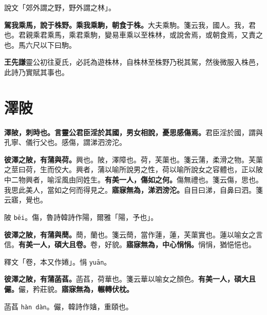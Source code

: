 \begin{quoting}說文「郊外謂之野，野外謂之林」。\end{quoting}

\textbf{駕我乘馬，說于株野。乘我乘駒，朝食于株。}{\footnotesize 大夫乘駒。箋云我，國人。我，君也。君親乘君乘馬，乘君乘駒，變易車乘以至株林，或說舍焉，或朝食焉，又責之也。馬六尺以下曰駒。}

\begin{quoting}\textbf{王先謙}靈公初往夏氏，必託為遊株林，自株林至株野乃税其駕，然後微服入株邑，此詩乃實賦其事也。\end{quoting}

\section{澤陂}


\textbf{澤陂，刺時也。言靈公君臣淫於其國，男女相說，憂思感傷焉。}{\footnotesize 君臣淫於國，謂與孔寧、儀行父也。感傷，謂涕泗滂沱。}

\textbf{彼澤之陂，有蒲與荷。}{\footnotesize 興也。陂，澤障也。荷，芙蕖也。箋云蒲，柔滑之物。芙蕖之莖曰荷，生而佼大。興者，蒲以喻所說男之性，荷以喻所說女之容體也，正以陂中二物興者，喻淫風由同姓生。}\textbf{有美一人，傷如之何。}{\footnotesize 傷無禮也。箋云傷，思也。我思此美人，當如之何而得見之。}\textbf{寤寐無為，涕泗滂沱。}{\footnotesize 自目曰涕，自鼻曰泗。箋云寤，覺也。}

\begin{quoting}陂 \texttt{bēi}。傷，魯詩韓詩作陽，爾雅「陽，予也」。\end{quoting}

\textbf{彼澤之陂，有蒲與蕳。}{\footnotesize 蕳，蘭也。箋云蕳，當作蓮，蓮，芙蕖實也。蓮以喻女之言信。}\textbf{有美一人，碩大且卷。}{\footnotesize 卷，好貌。}\textbf{寤寐無為，中心悁悁。}{\footnotesize 悁悁，猶悒悒也。}

\begin{quoting}釋文「卷，本又作婘」。悁 \texttt{yuān}。\end{quoting}

\textbf{彼澤之陂，有蒲菡萏。}{\footnotesize 菡萏，荷華也。箋云華以喻女之顏色。}\textbf{有美一人，碩大且儼。}{\footnotesize 儼，矜莊貌。}\textbf{寤寐無為，輾轉伏枕。}

\begin{quoting}菡萏 \texttt{hàn dàn}。儼，韓詩作㜝，重頤也。\end{quoting}

